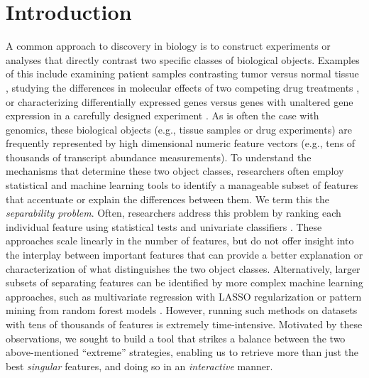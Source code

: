 
\section{Introduction}
\label{sec:intro}


A common approach to discovery in biology
is to construct experiments or analyses that directly
contrast two specific classes of biological objects.
Examples of this include examining patient samples
contrasting tumor versus normal tissue \needcite{},
studying the differences in molecular effects
of two competing drug treatments \needcite{},
or characterizing differentially expressed genes
versus genes with unaltered gene expression
in a carefully designed experiment \needcite{}.
As is often the case with genomics, these
biological objects (e.g., tissue samples or drug experiments)
are frequently represented by high dimensional numeric feature vectors (e.g., tens of thousands of transcript abundance measurements).
To understand the mechanisms that determine 
these two object classes,
researchers often employ statistical and
machine learning tools to identify a
manageable subset of features that
accentuate or explain the differences between them.
We term this the {\em separability problem}.
Often, researchers address this problem
by ranking each individual feature
using statistical tests \needcite{}
and univariate classifiers \needcite{}.
These approaches scale linearly in the number of features,
but do not offer insight into the interplay
between important features that can provide a better
explanation or characterization of what
distinguishes the two object classes.
Alternatively, larger subsets of separating
features can be identified by more complex 
machine learning approaches, such as multivariate 
regression with LASSO regularization \needcite{} 
or pattern mining from random forest models .
However, running such methods on datasets with 
tens of thousands of features is extremely time-intensive.
Motivated by these observations,
we sought to build a tool that strikes a balance between the
two above-mentioned ``extreme''
strategies, enabling us to retrieve more than just the best {\em singular} features, and doing so in an {\em interactive} manner.

